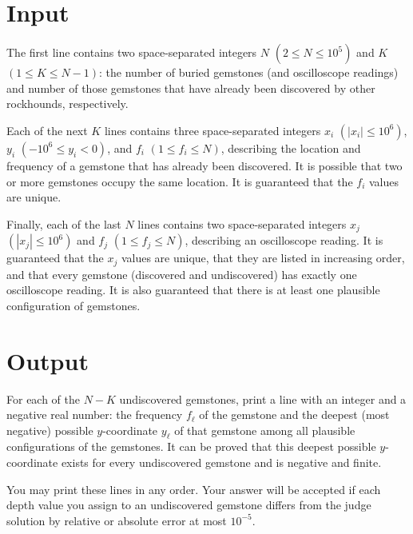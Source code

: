 \section*{Input}
The first line contains two space-separated integers $N$ $(2 \le N \le 10^5)$ and $K$ $(1 \le K \le N - 1)$: the number of buried gemstones (and oscilloscope readings) and number of those gemstones that have already been discovered by other rockhounds, respectively.

Each of the next $K$ lines contains three space-separated integers $x_i$ $(|x_i| \le 10^6)$, $y_i$ $(-10^6 \le y_i < 0)$, and $f_i$ $(1 \le f_i \le N)$, describing the location and frequency of a gemstone that has already been discovered.  It is possible that two or more gemstones occupy the same location. It is guaranteed that the $f_i$ values are unique.

Finally, each of the last $N$ lines contains two space-separated integers $x_j$ $(|x_j| \le 10^6)$ and $f_j$ $(1 \le f_j \le N)$, describing an oscilloscope reading. It is guaranteed that the $x_j$ values are unique, that they are listed in increasing order, and that every gemstone (discovered and undiscovered) has exactly one oscilloscope reading. It is also guaranteed that there is at least one plausible configuration of gemstones.

\section*{Output}
For each of the $N-K$ undiscovered gemstones, print a line with an integer and a negative real number: the frequency $f_\ell$ of the gemstone and the deepest (most negative) possible $y$-coordinate $y_\ell$ of that gemstone among all plausible configurations of the gemstones. It can be proved that this deepest possible $y$-coordinate exists for every undiscovered gemstone and is negative and finite.

You may print these lines in any order.
Your answer will be accepted if each depth value you assign to an undiscovered gemstone differs from the judge solution by relative or absolute error at most $10^{-5}$.
